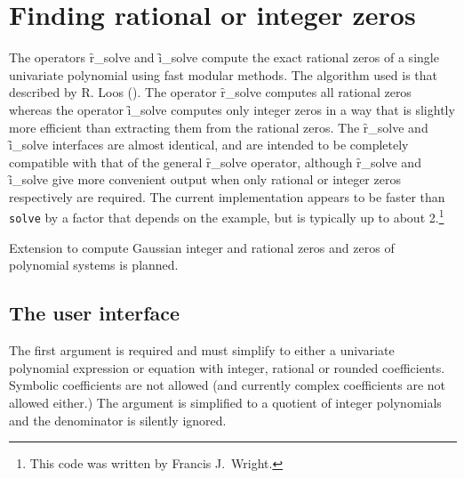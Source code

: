 \section{Finding rational or integer zeros}

\iffalse
  The operators \f{r\_solve} and \f{i_\solve}  compute
  respectively the exact rational or integer zeros of a single
  univariate polynomial using fast modular methods.


  \subsection{Introduction}
  \fi
{}
\hypertarget{operator:I_SOLVE}{}
\hypertarget{operator:R_SOLVE}{}
The operators \f{r\_solve} and \f{i\_solve}  compute the exact rational zeros
of a single univariate polynomial using fast modular methods.  The
algorithm used is that described by R. Loos (\cite{Loos:1983a}).
The operator \f{r\_solve} computes
all rational zeros whereas the operator \f{i\_solve} computes only
integer zeros in a way that is slightly more efficient than extracting
them from the rational zeros.  The \f{r\_solve} and \f{i\_solve}
interfaces are almost identical, and are intended to be completely
compatible with that of the general \f{r\_solve} operator, although
\f{r\_solve} and \f{i\_solve} give more convenient output when
only rational or integer zeros respectively are required.  The current
implementation appears to be faster than \verb|solve| by a factor that
depends on the example, but is typically up to about 2.\footnote{This code was written by Francis J.~Wright.}

Extension to compute Gaussian integer and rational
zeros and zeros of polynomial systems is planned.


\subsection{The user interface}

The first argument is required and must simplify to either a
univariate polynomial expression or equation with integer, rational or
rounded coefficients.  Symbolic coefficients are not allowed (and
currently complex coefficients are not allowed either.)  The argument
is simplified to a quotient of integer polynomials and the denominator
is silently ignored.

